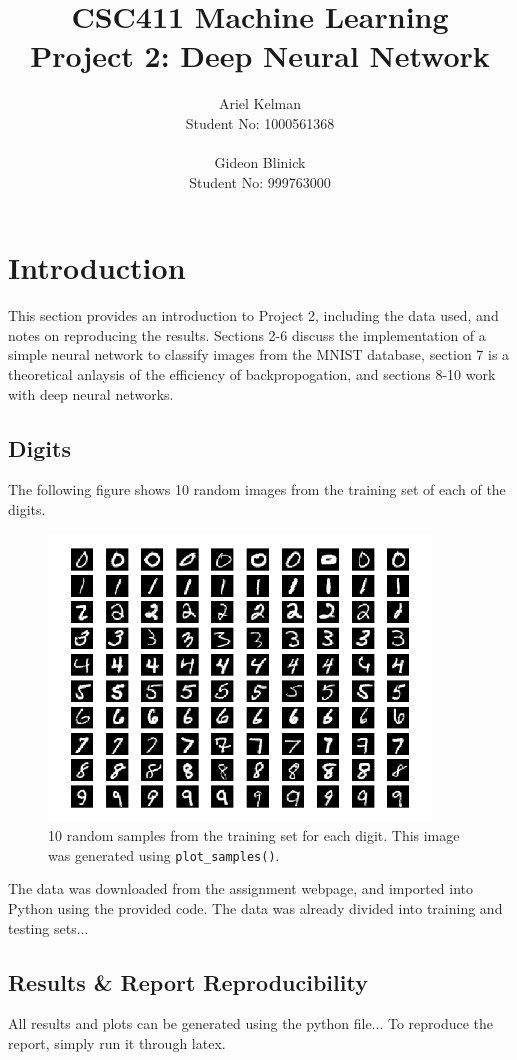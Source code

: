 \documentclass{article}
\title{CSC411 Machine Learning \\ Project 2: Deep Neural Network}
\author{ Ariel Kelman \\ Student No: 1000561368
         \\ \\
         Gideon Blinick \\ Student No: 999763000 }
\begin{document}
   \maketitle{}


   \section{Introduction}
   This section provides an introduction to Project 2, including the data used, and notes
   on reproducing the results. Sections 2-6 discuss the implementation of a simple neural
   network to classify images from the MNIST database, section 7 is a theoretical anlaysis
   of the efficiency of backpropogation, and sections 8-10 work with deep neural networks.

   \subsection{Digits}
   The following figure shows 10 random images from the training set of each of the digits.
   \begin{figure}[H] \centering
      \includegraphics[width=4in]{resources/part1}
      \caption{10 random samples from the training set for each digit. This image
         was generated using \texttt{plot\_samples()}. }
   \end{figure}
   The data was downloaded from the assignment webpage, and imported into Python using the
   provided code. The data was already divided into training and testing sets...

   \subsection{Results \& Report Reproducibility}
   All results and plots can be generated using the python file...
   To reproduce the report, simply run it through latex.
\end{document}
